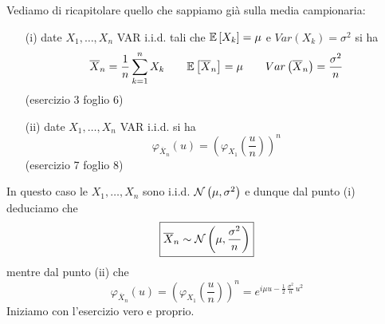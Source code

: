 \Soluzione{} %

\Soluzione{} %

\Soluzione{} %

\Soluzione{} %

\Soluzione{} %

\Soluzione{} %

\Soluzione{} %

\Soluzione{} %

\Soluzione{} %

\Soluzione{} %

\Soluzione{} %

\Soluzione{} %

\Soluzione{} %

Vediamo di ricapitolare quello che sappiamo già sulla media campionaria:

\begin{enumerate}

\item [(i)] date $X_1,\dots,X_n$ VAR i.i.d. tali che $\mathbb{E}\left[X_k \right]=\mu$ e $Var(X_k)=\sigma^2$ si ha
$$
\overline{X}_n = \frac{1}{n}\sum_{k=1}^n X_k \qquad \mathbb{E}\left[\overline{X}_n\right]=\mu \qquad Var\left(\overline{X}_n\right)=\frac{\sigma^2}{n}
$$
(esercizio 3 foglio 6)

\item [(ii)] date $X_1,\dots,X_n$ VAR i.i.d. si ha
$$
\varphi_{\overline{X}_n}(u)=\left(\varphi_{X_1}\left(\frac{u}{n}\right)\right)^n
$$
(esercizio 7 foglio 8)

\end{enumerate}

In questo caso le $X_1,\dots,X_n$ sono i.i.d. $\mathcal{N}\left(\mu,\sigma^2\right)$ e dunque dal punto (i) deduciamo che
$$
\boxed{\overline{X}_n\sim\mathcal{N}\left(\mu,\frac{\sigma^2}{n}\right)}
$$
mentre dal punto (ii) che 
$$
\boxed{\varphi_{\overline{X}_n}(u)=\left(\varphi_{X_1}\left(\frac{u}{n}\right)\right)^n=e^{i\mu u-\frac{1}{2}\,\frac{\sigma^2}{n}\, u^2}}
$$
Iniziamo con l'esercizio vero e proprio.

